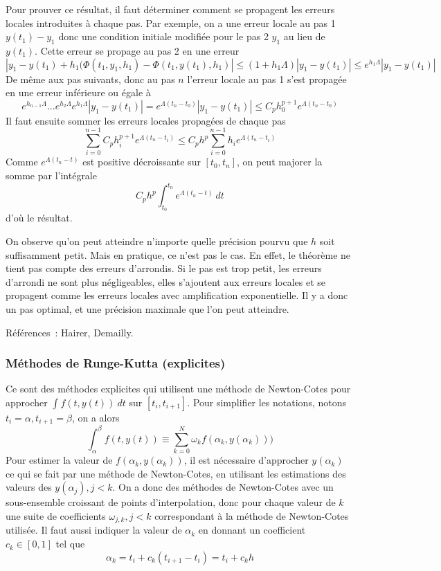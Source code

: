 \documentclass[a4paper,11pt]{article}
\begin{document}
\begin{giacjshere}
Pour prouver ce r\'esultat, il faut d\'eterminer comment se propagent
les erreurs locales introduites \`a chaque pas.
Par exemple, on a une erreur locale au pas 1 $y(t_1)-y_1$ donc une
condition initiale modifi\'ee pour le pas 2 $y_1$ au lieu de $y(t_1)$.
Cette erreur se propage au pas 2 en une erreur 
$$| y_1-y(t_1)+h_1(\Phi(t_1,y_1,h_1)-\Phi(t_1,y(t_1),h_1)| 
\leq (1+h_1 \Lambda)|y_1-y(t_1)| \leq e^{h_1 \Lambda} |y_1-y(t_1)|$$
De m\^eme aux pas suivants, donc au pas $n$ l'erreur locale au pas 1
s'est propag\'ee en une erreur inf\'erieure ou \'egale \`a~
$$ e^{h_{n-1} \Lambda}... e^{h_2 \Lambda} e^{h_1 \Lambda} |y_1-y(t_1)|
= e^{\Lambda (t_n-t_0)} |y_1-y(t_1)| \leq C_ph_0^{p+1} e^{\Lambda (t_n-t_0)}$$
Il faut ensuite sommer les erreurs locales propag\'ees de chaque pas
$$ \sum_{i=0}^{n-1} C_p h_i^{p+1} e^{\Lambda (t_n-t_i)} 
\leq C_p h^p \sum_{i=0}^{n-1} h_i e^{\Lambda (t_n-t_i)} $$
Comme $e^{\Lambda(t_n-t)}$ est positive d\'ecroissante sur
$[t_0,t_n]$, on peut majorer la somme par l'int\'egrale
$$ C_p h^p \int_{t_0}^{t_n} e^{\Lambda (t_n-t)} \ dt $$
d'o\`u le r\'esultat.

On observe qu'on peut atteindre n'importe quelle pr\'ecision pourvu
que $h$ soit suffisamment petit. Mais en pratique, ce n'est pas le cas.
En effet, le th\'eor\`eme ne tient pas compte des erreurs d'arrondis.
Si le pas est trop petit, les erreurs d'arrondi ne sont plus n\'egligeables,
elles s'ajoutent aux erreurs locales et se propagent comme les erreurs
locales avec amplification exponentielle.
Il y a donc un pas optimal, et une pr\'ecision maximale que l'on peut
atteindre.

R\'ef\'erences~: Hairer, Demailly.

\subsubsection{Méthodes de Runge-Kutta (explicites)}
Ce sont des méthodes explicites qui 
utilisent une méthode de Newton-Cotes pour approcher
$\int f(t,y(t)) \ dt$ sur $[t_i,t_{i+1}]$.
Pour simplifier les notations, notons $t_i=\alpha, t_{i+1}=\beta$,
on a alors
$$ \int_{\alpha}^{\beta} f(t,y(t)) 
\equiv \sum_{k=0}^N \omega_k f(\alpha_k,y(\alpha_k)))$$
Pour estimer la valeur de $f(\alpha_k,y(\alpha_k))$, il est nécessaire
d'approcher $y(\alpha_k)$ ce qui se fait par une méthode
de Newton-Cotes, en utilisant les estimations des
valeurs des $y(\alpha_j), j<k$. On a 
donc des méthodes de Newton-Cotes avec un sous-ensemble croissant
de points d'interpolation, donc pour chaque valeur de $k$ une
suite de coefficients $\omega_{j,k}, j<k$ correspondant \`a la
m\'ethode de Newton-Cotes utilis\'ee. Il faut aussi indiquer la valeur de
$\alpha_k$ en donnant un coefficient $c_k \in [0,1]$ tel que
$$ \alpha_k = t_i + c_k (t_{i+1}-t_i) = t_i+c_k h$$


\end{giacjshere}
\end{document}
